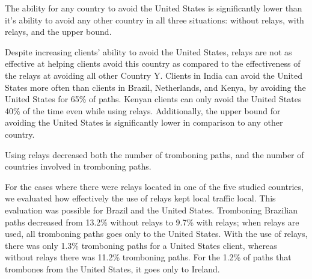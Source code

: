 \begin{finding}
The ability for any country to avoid the United States is significantly lower than it's ability to avoid any other country in all three situations: without relays, with relays, and the upper bound. 
\end{finding}
\noindent
Despite increasing clients' ability to avoid the United States, relays are not as effective at helping clients avoid this country as compared to the effectiveness of the relays at avoiding all other Country Y.  Clients in India can avoid the United States more often than clients in Brazil, Netherlands, and Kenya, by avoiding the United States for 65\% of paths.  Kenyan clients can only avoid the United States 40\% of the time even while using relays.  Additionally, the upper bound for avoiding the United States is significantly lower in comparison to any other country.  

\begin{finding}
Using relays decreased both the number of tromboning paths, and the
number of countries involved in tromboning paths.
\end{finding}
\noindent
For the cases where there were relays located in one of the five studied countries, we evaluated how effectively the use of relays kept local traffic local.  This evaluation was possible for Brazil and the United States.  Tromboning Brazilian paths decreased from 13.2\% without relays to 9.7\% with relays; when relays are used, all tromboning paths goes only to the United States.  With the use of relays, there was only 1.3\% tromboning paths for a United States client, whereas without relays there was 11.2\% tromboning paths.  For the 1.2\% of paths that trombones from the United States, it goes only to Ireland.


